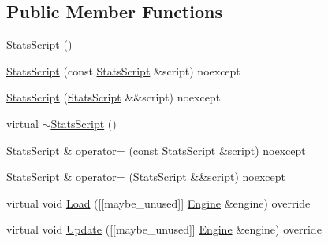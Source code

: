 \subsection*{Public Member Functions}
\begin{DoxyCompactItemize}
\item 
\hyperlink{classmage_1_1script_1_1_stats_script_a6863940cb48633fbd5fc56547dc72a76}{Stats\+Script} ()
\item 
\hyperlink{classmage_1_1script_1_1_stats_script_a3fb4aa69fc341df0fe2c2ad03f0ff278}{Stats\+Script} (const \hyperlink{classmage_1_1script_1_1_stats_script}{Stats\+Script} \&script) noexcept
\item 
\hyperlink{classmage_1_1script_1_1_stats_script_a9ac8ca59744a668504010b0f496f266f}{Stats\+Script} (\hyperlink{classmage_1_1script_1_1_stats_script}{Stats\+Script} \&\&script) noexcept
\item 
virtual \hyperlink{classmage_1_1script_1_1_stats_script_a5b9b30aa6939968c2aee8cdf11f6486c}{$\sim$\+Stats\+Script} ()
\item 
\hyperlink{classmage_1_1script_1_1_stats_script}{Stats\+Script} \& \hyperlink{classmage_1_1script_1_1_stats_script_a538428ec1763e0fb4b41839e7943ca56}{operator=} (const \hyperlink{classmage_1_1script_1_1_stats_script}{Stats\+Script} \&script) noexcept
\item 
\hyperlink{classmage_1_1script_1_1_stats_script}{Stats\+Script} \& \hyperlink{classmage_1_1script_1_1_stats_script_ae99dbfbff061fcc916c968d670a1e481}{operator=} (\hyperlink{classmage_1_1script_1_1_stats_script}{Stats\+Script} \&\&script) noexcept
\item 
virtual void \hyperlink{classmage_1_1script_1_1_stats_script_a4bfada754da5ca76591c5e7b9b0b1f51}{Load} (\mbox{[}\mbox{[}maybe\+\_\+unused\mbox{]}\mbox{]} \hyperlink{classmage_1_1_engine}{Engine} \&engine) override
\item 
virtual void \hyperlink{classmage_1_1script_1_1_stats_script_aad8c3b8fb846d47605b1f1d14f1ea157}{Update} (\mbox{[}\mbox{[}maybe\+\_\+unused\mbox{]}\mbox{]} \hyperlink{classmage_1_1_engine}{Engine} \&engine) override
\end{DoxyCompactItemize}
